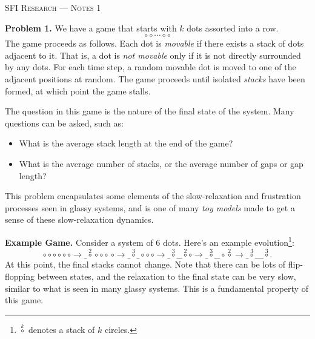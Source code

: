 \documentclass[10pt]{article}        	%
\begin{document}
\begin{center}
	\large{\textsc{SFI Research --- Notes 1}}\\\vspace{6pt}
	\small{}
\end{center}
\vspace{7pt}


\noindent \textbf{Problem 1.} We have a game that starts with $k$ dots assorted into a row. $$\circ\circ\cdots \circ\circ$$ The game proceeds as follows. Each dot is \textit{movable} if there exists a stack of dots adjacent to it. That is, a dot is \textit{not movable} only if it is not directly surrounded by any dots. For each time step, a random movable dot is moved to one of the adjacent positions at random. The game proceeds until isolated \textit{stacks} have been formed, at which point the game stalls.

The question in this game is the nature of the final state of the system. Many questions can be asked, such as:
\begin{itemize}
	\item What is the average stack length at the end of the game?
	\item What is the average number of stacks, or the average number of gaps or gap length?
\end{itemize}

\noindent This problem encapsulates some elements of the slow-relaxation and frustration processes seen in glassy systems, and is one of many \textit{toy models} made to get a sense of these slow-relaxation dynamics.

\bigskip
\noindent \textbf{Example Game.} Consider a system of 6 dots. Here's an example evolution\footnote{$\stackrel{k}{\circ}$ denotes a stack of $k$ circles.}: $$\circ\circ\circ\circ\circ\,\circ \rightarrow \_\stackrel{2}{\circ}\circ\circ\circ\,\circ\rightarrow \_\stackrel{3}{\circ}\_\circ\circ\,\circ\rightarrow \_\stackrel{3}{\circ}\_\_\stackrel{2}{\circ}\circ\rightarrow \_\stackrel{3}{\circ}\_\_\circ\stackrel{2}{\circ}\rightarrow \_\stackrel{3}{\circ}\_\_\_\stackrel{3}{\circ}.$$ At this point, the final stacks cannot change. Note that there can be lots of flip-flopping between states, and the relaxation to the final state can be very slow, similar to what is seen in many glassy systems. This is a fundamental property of this game.
\end{document}
